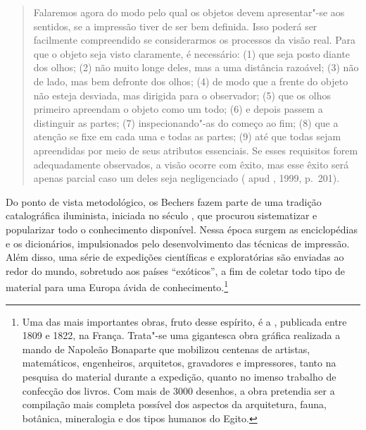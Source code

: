 \begin{quote}
Falaremos agora do modo pelo qual os objetos devem apresentar"-se aos
sentidos, se a impressão tiver de ser bem definida. Isso poderá ser
facilmente compreendido se considerarmos os processos da visão real.
Para que o objeto seja visto claramente, é necessário: (1) que seja
posto diante dos olhos; (2) não muito longe deles, mas a uma distância
razoável; (3) não de lado, mas bem defronte dos olhos; (4) de modo que a
frente do objeto não esteja desviada, mas dirigida para o observador;
(5) que os olhos primeiro apreendam o objeto como um todo; (6) e depois
passem a distinguir as partes; (7) inspecionando"-as do começo ao fim;
(8) que a atenção se fixe em cada uma e todas as partes; (9) até que
todas sejam apreendidas por meio de seus atributos essenciais. Se esses
requisitos forem adequadamente observados, a visão ocorre com êxito, mas
esse êxito será apenas parcial caso um deles seja negligenciado
( apud , 1999, p.~201).
\end{quote}

Do ponto de vista metodológico, os Bechers fazem parte de uma tradição
catalográfica iluminista, iniciada no século , que procurou
sistematizar e popularizar todo o conhecimento disponível. Nessa época
surgem as enciclopédias e os dicionários, impulsionados pelo
desenvolvimento das técnicas de impressão. Além disso, uma série de
expedições científicas e exploratórias são enviadas ao redor do mundo,
sobretudo aos países ``exóticos'', a fim de coletar todo tipo de
material para uma Europa ávida de conhecimento.\footnote{Uma das mais
  importantes obras, fruto desse espírito, é a {}, publicada entre 1809 e 1822, na França. Trata"-se uma
  gigantesca obra gráfica realizada a mando de Napoleão Bonaparte que
  mobilizou centenas de artistas, matemáticos, engenheiros, arquitetos,
  gravadores e impressores, tanto na pesquisa do material durante a
  expedição, quanto no imenso trabalho de confecção dos livros. Com mais
  de 3000 desenhos, a obra pretendia ser a compilação mais completa
  possível dos aspectos da arquitetura, fauna, botânica, mineralogia e
  dos tipos humanos do Egito.}

